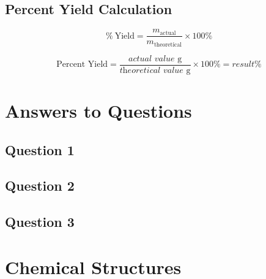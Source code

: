 \documentclass[
	11pt,
	letterpaper,
]{article}
\begin{document}

\subsection{Percent Yield Calculation}

\begin{equation}
	\%\ \text{Yield} = \frac{m_{\text{actual}}}{m_{\text{theoretical}}} \times 100\%
\end{equation}

\[
\text{Percent Yield} = \frac{\textit{actual value} \text{ g}}{\textit{theoretical value} \text{ g}} \times 100\% = \textit{result}\%
\]


\section{Answers to Questions}


\subsection{Question 1}


\subsection{Question 2}


\subsection{Question 3}



\section{Chemical Structures}
\end{document}
